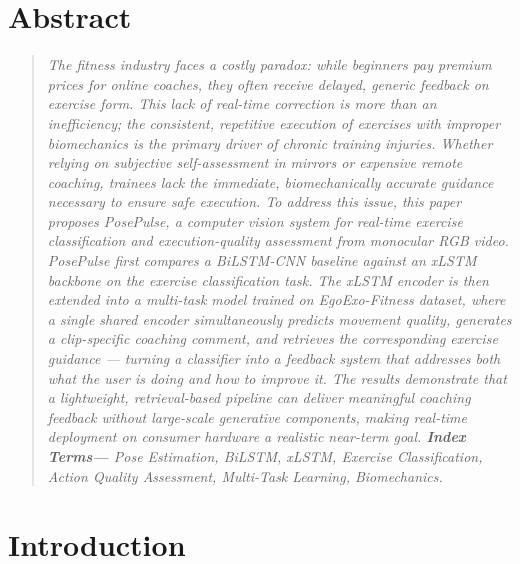 \documentclass[conference,onecolumn,oneside]{IEEEtran}
\begin{document}
\section*{Abstract}
\begin{quotation}
\itshape
The fitness industry faces a costly paradox: while beginners pay premium prices for online coaches, they often receive delayed, generic feedback on exercise form. This lack of real-time correction is more than an inefficiency; the consistent, repetitive execution of exercises with improper biomechanics is the primary driver of chronic training injuries. Whether relying on subjective self-assessment in mirrors or expensive remote coaching, trainees lack the immediate, biomechanically accurate guidance necessary to ensure safe execution.
To address this issue, this paper proposes PosePulse, a computer vision system for real-time exercise classification and execution-quality assessment from monocular RGB video.  PosePulse first compares a BiLSTM-CNN baseline against an xLSTM backbone on the exercise classification task. The xLSTM encoder is then extended into a multi-task model trained on EgoExo-Fitness dataset, where a single shared encoder simultaneously predicts movement quality, generates a clip-specific coaching comment, and retrieves the corresponding exercise guidance --- turning a classifier into a feedback system that addresses both what the user is doing and how to improve it.
The results demonstrate that a lightweight, retrieval-based pipeline
can deliver meaningful coaching feedback without large-scale generative
components, making real-time deployment on consumer hardware a
realistic near-term goal.
\vspace*{0.3cm}
\textbf{Index Terms---} Pose Estimation, BiLSTM, xLSTM, Exercise Classification,
Action Quality Assessment, Multi-Task Learning, Biomechanics.
\end{quotation}
\newpage
\vspace*{1cm}
\tableofcontents
\newpage

\section{Introduction}
\vspace*{1cm}
\end{document}
